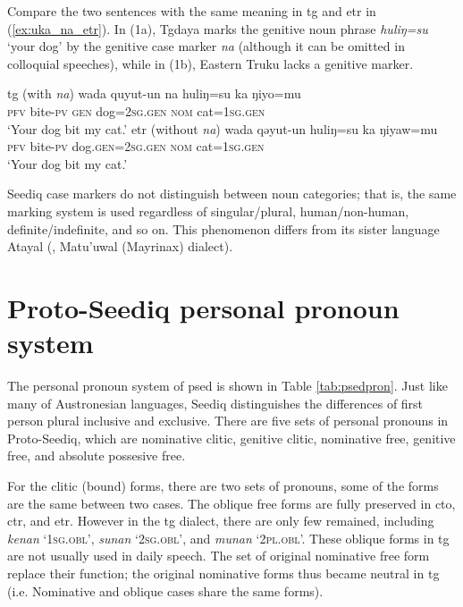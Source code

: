 Compare the two sentences with the same meaning in \acl{tg} and \acl{etr} in (\ref{ex:uka_na_etr}). In (1a), Tgdaya marks the genitive noun phrase \textit{huliŋ=su} `your dog' by the genitive case marker \textit{na} (although it can be omitted in colloquial speeches), while in (1b), Eastern Truku lacks a genitive marker. 

\begin{exe}
\ex \label{ex:uka_na_etr} \textcite[69]{Lee2018Trugrammar}
    \begin{xlist}
    \ex \acl{tg} (with \textit{na})
    \gll wada quyut-un na huliŋ=su ka ŋiyo=mu \\
    \textsc{pfv} bite-\textsc{pv} \textsc{gen} dog=\textsc{2sg.gen} \textsc{nom} cat=\textsc{1sg.gen}\\
    \glt `Your dog bit my cat.'
    \ex \acl{etr} (without \textit{na})
    \gll wada qəyut-un huliŋ=su ka ŋiyaw=mu \\
    \textsc{pfv} bite-\textsc{pv} dog.\textsc{gen}=\textsc{2sg.gen} \textsc{nom} cat=\textsc{1sg.gen}\\
    \glt `Your dog bit my cat.'
    \end{xlist}
\end{exe}

Seediq case markers do not distinguish between noun categories; that is, the same marking system is used regardless of singular/plural, human/non-human, definite/indefinite, and so on. This phenomenon differs from its sister language Atayal (\cite{huang1995}, Matu'uwal (Mayrinax) dialect).

\section{Proto-Seediq personal pronoun system} \label{sec:psed_pron}

The personal pronoun system of \acl{psed} is shown in Table \ref{tab:psedpron}. Just like many of Austronesian languages, Seediq distinguishes the differences of first person plural inclusive and exclusive. There are five sets of personal pronouns in Proto-Seediq, which are nominative clitic, genitive clitic, nominative free, genitive free, and absolute possesive free. 

For the clitic (bound) forms, there are two sets of pronouns, some of the forms are the same between two cases. The oblique free forms are fully preserved in \acl{cto}, \acl{ctr}, and \acl{etr}. However in the \acl{tg} dialect, there are only few remained, including \textit{kenan} `\textsc{1sg.obl}', \textit{sunan} `\textsc{2sg.obl}', and \textit{munan} `\textsc{2pl.obl}'. These oblique forms in \acl{tg} are not usually used in daily speech. The set of original nominative free form replace their function; the original nominative forms thus became neutral in \acl{tg} (i.e. Nominative and oblique cases share the same forms).

